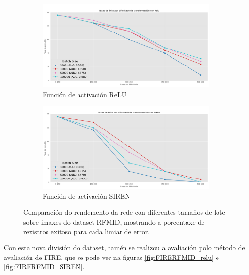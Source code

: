 \begin{figure}[tbp]
    \centering
    \begin{subfigure}[b]{0.5\textwidth}
        \centering
        \includegraphics[width=\textwidth]{imaxes/batchsize/experiment_plot_RFMID_bs_relu.png}
        \caption{Función de activación ReLU}
        \label{fig:batch_size_comparison_relu_rfmid}
    \end{subfigure}\hfill
    \begin{subfigure}[b]{0.5\textwidth}
        \centering
        \includegraphics[width=\textwidth]{imaxes/batchsize/experiment_plot_RFMID_bs_siren.png}
        \caption{Función de activación SIREN}
        \label{fig:batch_size_comparison_siren_rfmid}
    \end{subfigure}
    \caption{Comparación do rendemento da rede con diferentes tamaños de lote sobre imaxes do dataset RFMID, mostrando a porcentaxe de rexistros exitoso para cada limiar de error.}
    \label{fig:batch_size_comparisons_rfmid}
\end{figure}

Con esta nova división do dataset, tamén se realizou a avaliación polo método de avaliación de FIRE, que se pode ver na figuras \ref{fig:FIRERFMID_relu} e \ref{fig:FIRERFMID_SIREN}.

